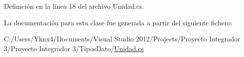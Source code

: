 Definición en la línea 18 del archivo Unidad.\-cs.



La documentación para esta clase fue generada a partir del siguiente fichero\-:\begin{DoxyCompactItemize}
\item 
C\-:/\-Users/\-Yknx4/\-Documents/\-Visual Studio 2012/\-Projects/\-Proyecto Integrador 3/\-Proyecto Integrador 3/\-Tipos\-Dato/\hyperlink{_unidad_8cs}{Unidad.\-cs}\end{DoxyCompactItemize}
